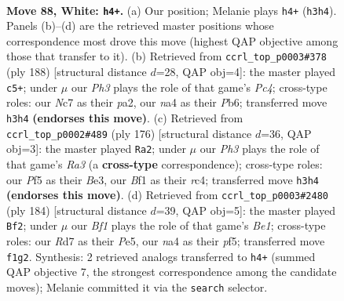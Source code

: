 \documentclass[11pt]{article}
\begin{document}
\clearpage

\begin{figure}[p]\centering
\begin{subfigure}{0.46\textwidth}\centering
\resizebox{\linewidth}{!}{%
\newchessgame
\chessboard[
  setfen={8/2NR4/2b5/5Pk1/np4P1/7P/8/5BK1 w - - 1 88},
  showmover=false,
  pgfstyle=straightmove, color=movearrow, markmove={h3-h4}
]}
\caption{}
\end{subfigure}\hfill
\begin{subfigure}{0.46\textwidth}\centering
\resizebox{\linewidth}{!}{%
\newchessgame
\chessboard[
  setfen={8/8/1P1kP3/3P4/b1PK4/8/p7/B7 w - - 1 95},
  showmover=false,
  pgfstyle=straightmove, color=movearrow, markmove={c4-c5}
]}
\caption{}
\end{subfigure}
\\[4pt]
\begin{subfigure}{0.46\textwidth}\centering
\resizebox{\linewidth}{!}{%
\newchessgame
\chessboard[
  setfen={8/8/6p1/2P2b2/2r5/R3Bk2/5P2/4K3 w - - 63 89},
  showmover=false,
  pgfstyle=straightmove, color=movearrow, markmove={a3-a2}
]}
\caption{}
\end{subfigure}\hfill
\begin{subfigure}{0.46\textwidth}\centering
\resizebox{\linewidth}{!}{%
\newchessgame
\chessboard[
  setfen={8/8/4k3/2b1Pp2/5Pp1/6P1/8/4BK2 w - - 15 93},
  showmover=false,
  pgfstyle=straightmove, color=movearrow, markmove={e1-f2}
]}
\caption{}
\end{subfigure}
\caption{\textbf{Move 88, White: \texttt{h4+}.} (a) Our position; Melanie plays \texttt{h4+} (\texttt{h3h4}). Panels (b)--(d) are the retrieved master positions whose correspondence most drove this move (highest QAP objective among those that transfer to it). (b) Retrieved from \texttt{ccrl\_top\_p0003\#378} (ply 188) [structural distance $d$=28, QAP obj=4]: the master played \texttt{c5+}; under $\mu$ our \emph{Ph3} plays the role of that game's \emph{Pc4}; cross-type roles: our \emph{N}c7 as their \emph{p}a2, our \emph{n}a4 as their \emph{P}b6; transferred move \texttt{h3h4} \textbf{(endorses this move)}. (c) Retrieved from \texttt{ccrl\_top\_p0002\#489} (ply 176) [structural distance $d$=36, QAP obj=3]: the master played \texttt{Ra2}; under $\mu$ our \emph{Ph3} plays the role of that game's \emph{Ra3} (a \textbf{cross-type} correspondence); cross-type roles: our \emph{P}f5 as their \emph{B}e3, our \emph{B}f1 as their \emph{r}c4; transferred move \texttt{h3h4} \textbf{(endorses this move)}. (d) Retrieved from \texttt{ccrl\_top\_p0003\#2480} (ply 184) [structural distance $d$=39, QAP obj=5]: the master played \texttt{Bf2}; under $\mu$ our \emph{Bf1} plays the role of that game's \emph{Be1}; cross-type roles: our \emph{R}d7 as their \emph{P}e5, our \emph{n}a4 as their \emph{p}f5; transferred move \texttt{f1g2}. Synthesis: 2 retrieved analogs transferred to \texttt{h4+} (summed QAP objective 7, the strongest correspondence among the candidate moves); Melanie committed it via the \texttt{search} selector.}
\label{fig:thought-m174}
\end{figure}
\end{document}
